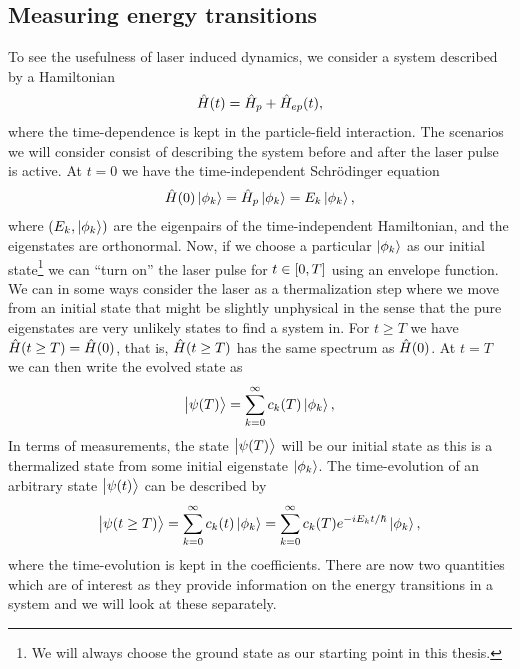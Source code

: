         \subsection{Measuring energy transitions}
            To see the usefulness of laser induced dynamics, we consider a
            system described by a Hamiltonian
            \begin{align}
                \hat{H}(t)
                = \hat{H}_p + \hat{H}_{ep}(t),
            \end{align}
            where the time-dependence is kept in the particle-field interaction.
            The scenarios we will consider consist of describing the system
            before and after the laser pulse is active.
            At $t = 0$ we have the time-independent Schrödinger equation
            \begin{align}
                \hat{H}(0)\ket{\phi_k}
                = \hat{H}_p\ket{\phi_k}
                = E_k\ket{\phi_k},
            \end{align}
            where $(E_k, \ket{\phi_k})$ are the eigenpairs of the
            time-independent Hamiltonian, and the eigenstates are orthonormal.
            Now, if we choose a particular $\ket{\phi_k}$ as our initial
            state\footnote{%
                We will always choose the ground state as our starting point in
                this thesis.
            } we can ``turn on'' the laser pulse for $t \in \left[ 0, T \right]$ using
            an envelope function.
            We can in some ways consider the laser as a thermalization step where
            we move from an initial state that might be slightly unphysical in
            the sense that the pure eigenstates are very unlikely states to find
            a system in.
            For $t \geq T$ we have $\hat{H}(t \geq T) = \hat{H}(0)$, that is,
            $\hat{H}(t \geq T)$ has the same spectrum as $\hat{H}(0)$.
            At $t = T$ we can then write the evolved state as
            \begin{align}
                \ket{\psi(T)} = \sum_{k = 0}^{\infty}
                c_k(T) \ket{\phi_k},
            \end{align}
            In terms of measurements, the state $\ket{\psi(T)}$ will be our
            initial state as this is a thermalized state from some initial
            eigenstate $\ket{\phi_k}$.
            The time-evolution of an arbitrary state $\ket{\psi(t)}$ can be
            described by
            \begin{align}
                \ket{\psi(t \geq T)}
                = \sum_{k = 0}^{\infty} c_k(t)\ket{\phi_k}
                = \sum_{k = 0}^{\infty}
                c_k(T) e^{-iE_k t/\hslash}\ket{\phi_k},
            \end{align}
            where the time-evolution is kept in the coefficients.
            There are now two quantities which are of interest as they provide
            information on the energy transitions in a system and we will look
            at these separately.

